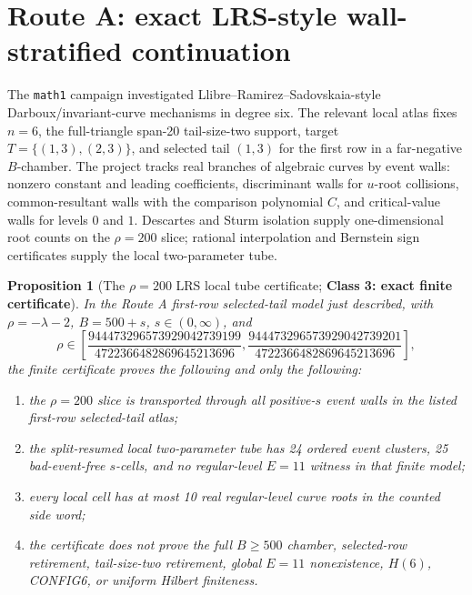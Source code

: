 \documentclass[11pt]{article}
\newtheorem{proposition}{Proposition}
\newcommand{\classthree}{\textbf{Class 3: exact finite certificate}}
\begin{document}
\section{Route A: exact LRS-style wall-stratified continuation}
The \texttt{math1} campaign investigated Llibre--Ramirez--Sadovskaia-style Darboux/invariant-curve mechanisms in degree six.  The relevant local atlas fixes \(n=6\), the full-triangle span-20 tail-size-two support, target \(T=\{(1,3),(2,3)\}\), and selected tail \((1,3)\) for the first row in a far-negative \(B\)-chamber.  The project tracks real branches of algebraic curves by event walls: nonzero constant and leading coefficients, discriminant walls for \(u\)-root collisions, common-resultant walls with the comparison polynomial \(C\), and critical-value walls for levels \(0\) and \(1\).  Descartes and Sturm isolation supply one-dimensional root counts on the \(\rho=200\) slice; rational interpolation and Bernstein sign certificates supply the local two-parameter tube.

\begin{proposition}[The \(\rho=200\) LRS local tube certificate; \classthree]\label{prop:rho200}
In the Route A first-row selected-tail model just described, with \(\rho=-\lambda-2\), \(B=500+s\), \(s\in(0,\infty)\), and
\[
  \rho\in\left[
  \frac{944473296573929042739199}{4722366482869645213696},
  \frac{944473296573929042739201}{4722366482869645213696}
  \right],
\]
the finite certificate proves the following and only the following:
\begin{enumerate}
\item the \(\rho=200\) slice is transported through all positive-\(s\) event walls in the listed first-row selected-tail atlas;
\item the split-resumed local two-parameter tube has 24 ordered event clusters, 25 bad-event-free \(s\)-cells, and no regular-level \(E=11\) witness in that finite model;
\item every local cell has at most 10 real regular-level curve roots in the counted side word;
\item the certificate does not prove the full \(B\ge500\) chamber, selected-row retirement, tail-size-two retirement, global \(E=11\) nonexistence, \(H(6)\), CONFIG6, or uniform Hilbert finiteness.
\end{enumerate}
\end{proposition}
\end{document}
